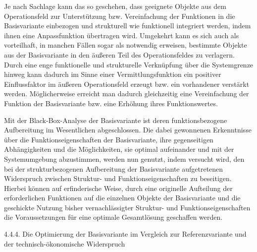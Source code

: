 \documentclass[12pt,a4paper]{article}
\begin{document}
Je nach Sachlage kann das so geschehen, dass geeignete Objekte aus dem Operationsfeld zur Unterstützung bzw. Vereinfachung der Funktionen in die Basisvariante einbezogen und strukturell wie funktionell integriert werden, indem ihnen eine Anpassfunktion übertragen wird. Umgekehrt kann es sich auch als vorteilhaft, in manchen Fällen sogar als notwendig erweisen, bestimmte Objekte aus der Basisvariante in den äußeren Teil des Operationsfeldes zu verlagern. Durch eine enge funktionelle und strukturelle Verknüpfung über die Systemgrenze hinweg kann dadurch im Sinne einer Vermittlungsfunktion ein positiver Einflussfaktor im äußeren Operationsfeld erzeugt bzw. ein vorhandener verstärkt werden. Möglicherweise erreicht man dadurch gleichzeitig eine Vereinfachung der Funktion der Basisvariante bzw. eine Erhöhung ihres Funktionswertes.

Mit der Black-Box-Analyse der Basisvariante ist deren funktionsbezogene Aufbereitung im Wesentlichen abgeschlossen. Die dabei gewonnenen Erkenntnisse über die Funktionseigenschaften der Basisvariante, ihre gegenseitigen Abhängigkeiten und die Möglichkeiten, sie optimal aufeinander und mit der Systemumgebung abzustimmen, werden nun genutzt, indem versucht wird, den bei der strukturbezogenen Aufbereitung der Basisvariante aufgetretenen Widerspruch zwischen Struktur- und Funktionseigenschaften zu beseitigen. Hierbei können auf erfinderische Weise, durch eine originelle Aufteilung der erforderlichen Funktionen auf die einzelnen Objekte der Basisvariante und die geschickte Nutzung bisher vernachlässigter Struktur- und Funktionseigenschaften die Voraussetzungen für eine optimale Gesamtlösung geschaffen werden.


4.4.4.  Die Optimierung der Basisvariante im Vergleich zur Referenzvariante und der technisch-ökonomische Widerspruch
\end{document}
